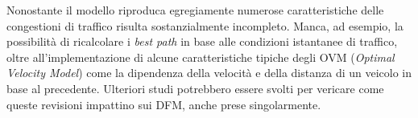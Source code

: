 \documentclass[../main.tex]{subfiles}
\begin{document}
Nonostante il modello riproduca egregiamente numerose caratteristiche delle congestioni di traffico risulta sostanzialmente incompleto.
Manca, ad esempio, la possibilit\`a di ricalcolare i \emph{best path} in base alle condizioni istantanee di traffico, oltre all'implementazione di alcune caratteristiche tipiche degli OVM (\emph{Optimal Velocity Model}) come la dipendenza della velocit\`a e della distanza di un veicolo in base al precedente.
Ulteriori studi potrebbero essere svolti per vericare come queste revisioni impattino sui DFM, anche prese singolarmente.
\end{document}
